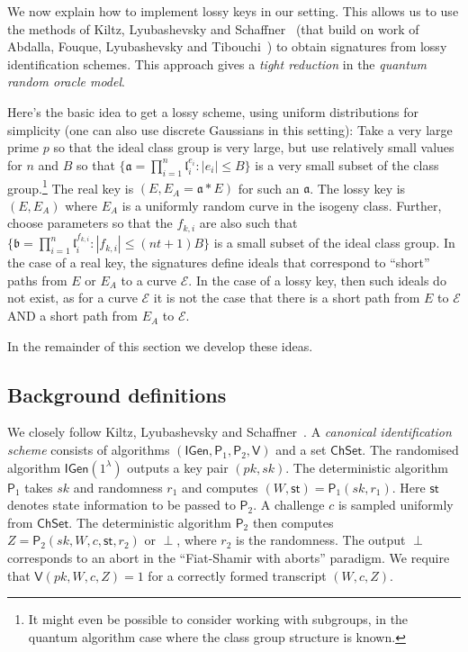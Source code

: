 \documentclass{llncs}
\newcommand{\E}{\mathcal{E}}
\renewcommand{\a}{\mathfrak{a}}
\renewcommand{\b}{\mathfrak{b}}
\renewcommand{\l}{\mathfrak{l}}
\newcommand{\IGen}{\mathsf{IGen}}
\newcommand{\PP}{\mathsf{P}}
\newcommand{\VV}{\mathsf{V}}
\newcommand{\ChSet}{\textsf{ChSet}}
\newcommand{\St}{\textsf{st}}
\begin{document}
We now explain how to implement lossy keys in our setting.
This allows us to use the methods of Kiltz, Lyubashevsky and Schaffner~\cite{KLS18} (that build on work of Abdalla, Fouque, Lyubashevsky and Tibouchi~\cite{AFLT12}) to obtain signatures from lossy identification schemes. This approach gives a \emph{tight reduction} in the \emph{quantum random oracle model}.


Here's the basic idea to get a lossy scheme, using uniform distributions for simplicity (one can also use discrete Gaussians in this setting):
Take a very large prime $p$ so that the ideal class group is very large, but use relatively small values for $n$ and $B$ so that $\{ \a = \prod_{i=1}^n \l_i^{e_i} : |e_i| \le B \}$ is a very small subset of the class group.\footnote{It might even be possible to consider working with subgroups, in the quantum algorithm case where the class group structure is known.}
The real key is $(E, E_A = \a*E )$ for such an $\a$.
The lossy key is $(E, E_A )$ where $E_A$ is a uniformly random curve in the isogeny class.
Further, choose parameters so that the $f_{k,i}$ are also such that $\{ \b = \prod_{i=1}^n \l_i^{f_{k,i}} : |f_{k,i}| \le (nt+1)B \}$ is a small subset of the ideal class group.
In the case of a real key, the signatures define ideals that correspond to ``short'' paths from $E$ or $E_A$ to a  curve $\E$.
In the case of a lossy key, then such ideals do not exist, as for a curve $\E$ it is not the case that there is a short path from $E$ to $\E$ AND a short path from $E_A$ to $\E$.

In the remainder of this section we develop these ideas.


\subsection{Background definitions} \label{sec:KLS-defns}

We closely follow Kiltz, Lyubashevsky and Schaffner~\cite{KLS18}.
A \emph{canonical identification scheme} consists of algorithms $(\IGen, \PP_1, \PP_2, \VV)$ and a set $\ChSet$. The randomised algorithm $\IGen( 1^\lambda )$ outputs a key pair $(pk,sk)$.
The deterministic algorithm $\PP_1$ takes $sk$ and randomness $r_1$ and computes $(W, \St) = \PP_1( sk, r_1 )$. 
Here $\St$ denotes state information to be passed to $\PP_2$.
A challenge $c$ is sampled uniformly from $\ChSet$. The deterministic algorithm $\PP_2$ then computes $Z = \PP_2( sk, W, c, \St, r_2 )$ or $\perp$, where $r_2$ is the randomness.
The output $\perp$ corresponds to an abort in the ``Fiat-Shamir with aborts'' paradigm.
We require that $\VV( pk, W, c, Z ) = 1$ for a correctly formed transcript $(W,c,Z)$.
\end{document}
